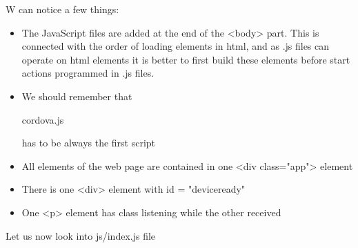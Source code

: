 W can notice a few things:
\begin{explain}
\begin{itemize}
\item The JavaScript files are added at the end of the <body> part. This is connected with the order of loading elements in html, and as .js files can operate on html elements it is better to first build these elements before start actions programmed in .js files.

\item We should remember that \begin{warning}cordova.js\end{warning} has to be always the first script

\item All elements of the web page are contained in one <div class="app"> element

\item There is one <div> element  with id = "deviceready"
\item One <p> element has class listening while the other received

\end{itemize}
\end{explain}

Let us now look into js/index.js file


